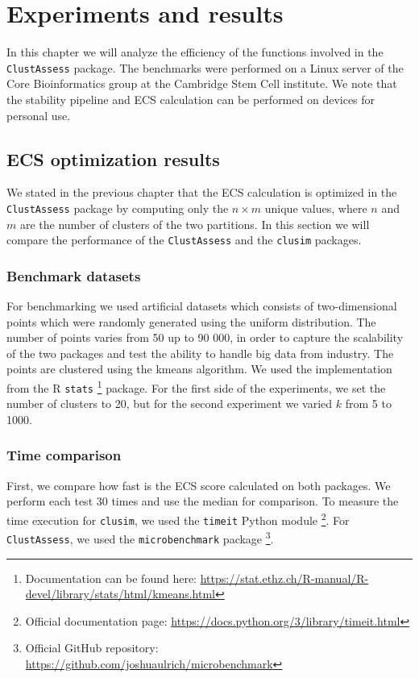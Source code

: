 \chapter{Experiments and results}
In this chapter we will analyze the efficiency of the functions involved in the \verb|ClustAssess| package. The benchmarks were performed on a Linux server of the Core Bioinformatics group at the Cambridge Stem Cell institute. We note that the stability pipeline and ECS calculation can be performed on devices for personal use.

\section{ECS optimization results}
We stated in the previous chapter that the ECS calculation is optimized in the \verb|ClustAssess| package by computing only the $n \times m$ unique values, where $n$ and $m$ are the number of clusters of the two partitions. In this section we will compare the performance of the \verb|ClustAssess| and the \verb|clusim| packages.

\subsection{Benchmark datasets}
For benchmarking we used artificial datasets which consists of two-dimensional points which were randomly generated using the uniform distribution. The number of points varies from 50 up to 90 000, in order to capture the scalability of the two packages and test the ability to handle big data from industry. The points are clustered using the kmeans algorithm. We used the implementation from the R \verb|stats| \footnote{Documentation can be found here: \url{https://stat.ethz.ch/R-manual/R-devel/library/stats/html/kmeans.html}} package. For the first side of the experiments, we set the number of clusters to 20, but for the second experiment we varied $k$ from 5 to 1000.

\subsection{Time comparison}
First, we compare how fast is the ECS score calculated on both packages. We perform each test 30 times and use the median for comparison. To measure the time execution for \verb|clusim|, we used the \verb|timeit| Python module \footnote{Official documentation page: \url{https://docs.python.org/3/library/timeit.html}}. For \verb|ClustAssess|, we used the \verb|microbenchmark| package \footnote{Official GitHub repository: \url{https://github.com/joshuaulrich/microbenchmark}}.

